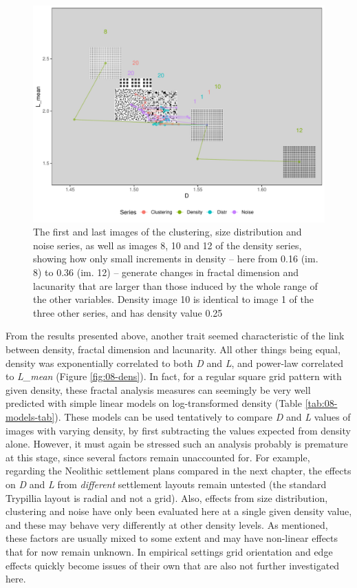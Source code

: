 \documentclass[
  12pt,
  a4paper, twoside]{book}
\begin{document}
\begin{figure}

{\centering \includegraphics[width=0.9\linewidth]{Results/fig08_all_im} 

}

\caption[Effect on D and L from density, compared to effects from size distribution, clustering and noise]{The first and last images of the clustering, size distribution and noise series, as well as images 8, 10 and 12 of the density series, showing how only small increments in density -- here from 0.16 (im. 8) to 0.36 (im. 12) -- generate changes in fractal dimension and lacunarity that are larger than those induced by the whole range of the other variables. Density image 10 is identical to image 1 of the three other series, and has density value 0.25}\label{fig:08-all-im}
\end{figure}

From the results presented above, another trait seemed characteristic of the link between density, fractal dimension and lacunarity. All other things being equal, density was exponentially correlated to both \emph{D} and \emph{L}, and power-law correlated to \emph{L\_mean} (Figure \ref{fig:08-dens}). In fact, for a regular square grid pattern with given density, these fractal analysis measures can seemingly be very well predicted with simple linear models on log-transformed density (Table \ref{tab:08-models-tab}). These models can be used tentatively to compare \emph{D} and \emph{L} values of images with varying density, by first subtracting the values expected from density alone. However, it must again be stressed such an analysis probably is premature at this stage, since several factors remain unaccounted for. For example, regarding the Neolithic settlement plans compared in the next chapter, the effects on \emph{D} and \emph{L} from \emph{different} settlement layouts remain untested (the standard Trypillia layout is radial and not a grid). Also, effects from size distribution, clustering and noise have only been evaluated here at a single given density value, and these may behave very differently at other density levels. As mentioned, these factors are usually mixed to some extent and may have non-linear effects that for now remain unknown. In empirical settings grid orientation and edge effects quickly become issues of their own that are also not further investigated here.
\end{document}

